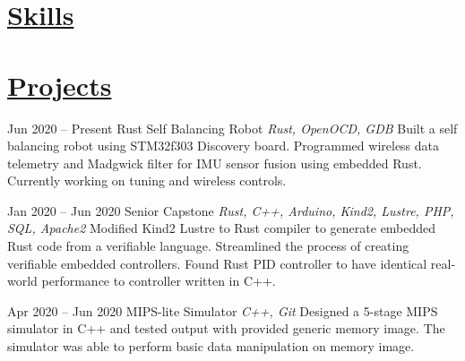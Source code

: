 \documentclass[letterpaper]{moderncv}        %
\begin{document}
	

\section{\underline{Skills}}


\section{\underline{Projects}}
\cventry
{Jun 2020 -- Present}
{Rust Self Balancing Robot}
{}
{\textit{Rust, OpenOCD, GDB}}
{}
{Built a self balancing robot using STM32f303 Discovery board.  Programmed wireless data telemetry and Madgwick filter for IMU sensor fusion using embedded Rust. Currently working on tuning and wireless controls.\\}


\cventry
{Jan 2020 -- Jun 2020}
{Senior Capstone}
{}
{\textit{Rust, C++, Arduino, Kind2, Lustre, PHP, SQL, Apache2}}
{}
{Modified Kind2 Lustre to Rust compiler to generate embedded Rust code from a verifiable language.  Streamlined the process of creating verifiable embedded controllers.  Found Rust PID controller to have identical real-world performance to controller written in C++.\\}
	

\cventry
{Apr 2020 -- Jun 2020}
{MIPS-lite Simulator}
{}
{\textit{C++, Git}}
{}
{Designed a 5-stage MIPS simulator in C++ and tested output with provided generic memory image.  The simulator was able to perform basic data manipulation on memory image.\\}
\end{document}
